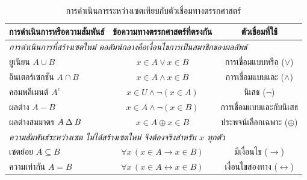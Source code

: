 \begin{table}[H]
\centering
\caption{การดำเนินการระหว่างเซตเทียบกับตัวเชื่อมทางตรรกศาสตร์}
\label{tab:setops-connectives}
\renewcommand{\arraystretch}{1.3}
\begin{tabular}{|l|c|c|}
\hline
\textbf{การดำเนินการหรือความสัมพันธ์} & \textbf{ข้อความทางตรรกศาสตร์ที่ตรงกัน} & \textbf{ตัวเชื่อมที่ใช้} \\
\hline
\multicolumn{3}{|l|}{\textit{การดำเนินการที่สร้างเซตใหม่ คอลัมน์กลางคือเงื่อนไขการเป็นสมาชิกของผลลัพธ์}} \\
\hline
ยูเนียน $A \cup B$ & $x \in A \lor x \in B$ & การเชื่อมแบบหรือ ($\lor$) \\
อินเตอร์เซกชัน $A \cap B$ & $x \in A \land x \in B$ & การเชื่อมแบบและ ($\land$) \\
คอมพลีเมนต์ $A^c$ & $x \in U \land \neg(x \in A)$ & นิเสธ ($\neg$) \\
ผลต่าง $A - B$ & $x \in A \land \neg(x \in B)$ & การเชื่อมแบบและกับนิเสธ \\
ผลต่างสมมาตร $A \mathbin{\Delta} B$ & $x \in A \oplus x \in B$ & ประพจน์เลือกเฉพาะ ($\oplus$) \\
\hline
\multicolumn{3}{|l|}{\textit{ความสัมพันธ์ระหว่างเซต ไม่ได้สร้างเซตใหม่ จึงต้องจริงสำหรับ $x$ ทุกตัว}} \\
\hline
เซตย่อย $A \subseteq B$ & $\forall x\,(x \in A \rightarrow x \in B)$ & มีเงื่อนไข ($\rightarrow$) \\
ความเท่ากัน $A = B$ & $\forall x\,(x \in A \leftrightarrow x \in B)$ & เงื่อนไขสองทาง ($\leftrightarrow$) \\
\hline
\end{tabular}
\end{table}

